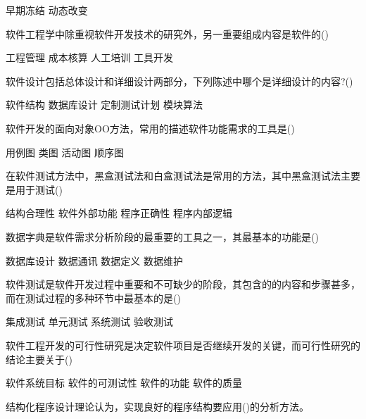 \documentclass[answers]{exam}
\begin{document}
\begin{questions}
\begin{oneparchoices}
		\choice 早期冻结
		\choice 动态改变
	\end{oneparchoices}
	\question 软件工程学中除重视软件开发技术的研究外，另一重要组成内容是软件的()\\
	\begin{oneparchoices}
		\correctchoice 工程管理
		\choice 成本核算
		\choice 人工培训
		\choice 工具开发
	\end{oneparchoices}
	\question 软件设计包括总体设计和详细设计两部分，下列陈述中哪个是详细设计的内容?()\\
	\begin{oneparchoices}
		\choice 软件结构
		\choice 数据库设计
		\choice 定制测试计划
		\correctchoice 模块算法
	\end{oneparchoices}
	\question 软件开发的面向对象OO方法，常用的描述软件功能需求的工具是()\\
	\begin{oneparchoices}
		\correctchoice 用例图
		\choice 类图
		\choice 活动图
		\choice 顺序图
	\end{oneparchoices}
	\question 在软件测试方法中，黑盒测试法和白盒测试法是常用的方法，其中黑盒测试法主要是用于测试()\\
	\begin{oneparchoices}
		\choice 结构合理性
		\correctchoice 软件外部功能
		\choice 程序正确性
		\choice 程序内部逻辑
	\end{oneparchoices}
	\question 数据字典是软件需求分析阶段的最重要的工具之一，其最基本的功能是()\\
	\begin{oneparchoices}
		\choice 数据库设计
		\choice 数据通讯
		\correctchoice 数据定义
		\choice 数据维护
	\end{oneparchoices}
	\question 软件测试是软件开发过程中重要和不可缺少的阶段，其包含的的内容和步骤甚多，而在测试过程的多种环节中最基本的是()\\
	\begin{oneparchoices}
		\choice 集成测试
		\correctchoice 单元测试
		\choice 系统测试
		\choice 验收测试
	\end{oneparchoices}
	\question 软件工程开发的可行性研究是决定软件项目是否继续开发的关键，而可行性研究的结论主要关于()\\
	\begin{oneparchoices}
		\correctchoice 软件系统目标
		\choice 软件的可测试性
		\choice 软件的功能
		\choice 软件的质量
	\end{oneparchoices}
	\question 结构化程序设计理论认为，实现良好的程序结构要应用()的分析方法。\\

\end{questions}
\end{document}
